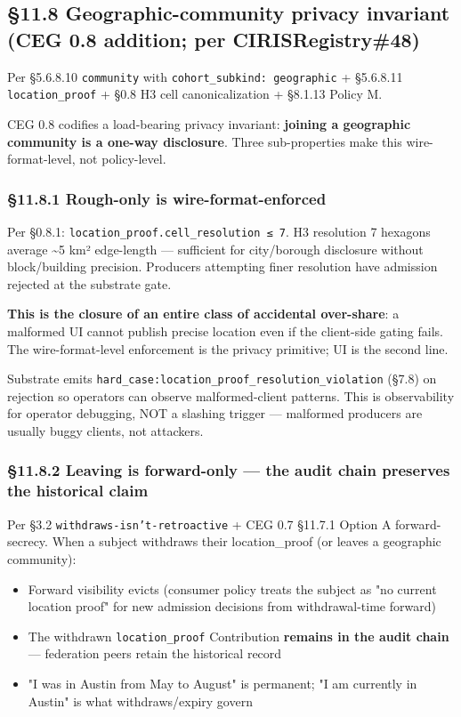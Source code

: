 \documentclass[11pt]{article}
\begin{document}
\subsection*{§11.8 Geographic-community privacy invariant (CEG 0.8 addition; per CIRISRegistry\#48)}


Per §5.6.8.10 \texttt{community} with \texttt{cohort\_subkind: geographic} + §5.6.8.11 \texttt{location\_proof} + §0.8 H3 cell canonicalization + §8.1.13 Policy M.


CEG 0.8 codifies a load-bearing privacy invariant: \textbf{joining a geographic community is a one-way disclosure}. Three sub-properties make this wire-format-level, not policy-level.


\subsubsection*{§11.8.1 Rough-only is wire-format-enforced}


Per §0.8.1: \texttt{location\_proof.cell\_resolution ≤ 7}. H3 resolution 7 hexagons average \textasciitilde{}5 km² edge-length — sufficient for city/borough disclosure without block/building precision. Producers attempting finer resolution have admission rejected at the substrate gate.


\textbf{This is the closure of an entire class of accidental over-share}: a malformed UI cannot publish precise location even if the client-side gating fails. The wire-format-level enforcement is the privacy primitive; UI is the second line.


Substrate emits \texttt{hard\_case:location\_proof\_resolution\_violation} (§7.8) on rejection so operators can observe malformed-client patterns. This is observability for operator debugging, NOT a slashing trigger — malformed producers are usually buggy clients, not attackers.


\subsubsection*{§11.8.2 Leaving is forward-only — the audit chain preserves the historical claim}


Per §3.2 \texttt{withdraws-isn't-retroactive} + CEG 0.7 §11.7.1 Option A forward-secrecy. When a subject withdraws their location\_proof (or leaves a geographic community):


\begin{itemize}\setlength\itemsep{0pt}
\item Forward visibility evicts (consumer policy treats the subject as "no current location proof" for new admission decisions from withdrawal-time forward)
\item The withdrawn \texttt{location\_proof} Contribution \textbf{remains in the audit chain} — federation peers retain the historical record
\item "I was in Austin from May to August" is permanent; "I am currently in Austin" is what withdraws/expiry govern
\end{itemize}
\end{document}
